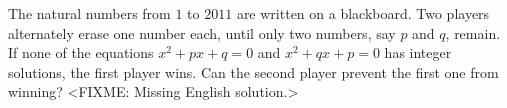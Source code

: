 \problem
The natural numbers from $1$ to $2011$ are written on a blackboard.
Two players alternately erase one number each, until only two numbers, say $p$
and $q$, remain.
If none of the equations $x^2 + p x + q = 0$ and $x^2 + q x + p = 0$ has
integer solutions, the first player wins.
Can the second player prevent the first one from winning?
\solution
<FIXME: Missing English solution.>
\endproblem
